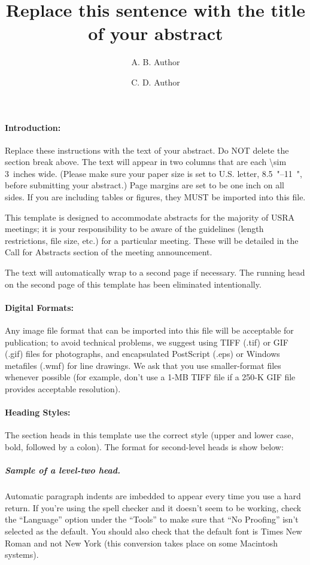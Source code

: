 \documentclass{lpsc_abstract}
\title{Replace this sentence with the title of your abstract}
\author[1]{A. B. Author}
\author[2]{C. D. Author}
\affil[1]{Affiliation (include full mailing address and e-mail address if desired) for first author}
\affil[2]{Affiliation for second author (full mailing address and e-mail address)}
\begin{document}
\maketitle

\paragraph{Introduction:}
Replace these instructions with the text of your abstract.
Do NOT delete the section break above.
The text will appear in two columns that are each \SI{\sim 3}{inches} wide.
(Please make sure your paper size is set to U.S. letter, \SIrange[range-phrase=$\times$]{8.5}{11}{"}, before submitting your abstract.)
Page margins are set to be one inch on all sides.
If you are including tables or figures, they MUST be imported into this file.

This template is designed to accommodate abstracts for the majority of USRA meetings; it is your responsibility to be aware of the guidelines (length restrictions, file size, etc.) for a particular meeting. These will be detailed in the Call for Abstracts section of the meeting announcement.

The text will automatically wrap to a second page if necessary. The running head on the second page of this template has been eliminated intentionally.

\paragraph{Digital Formats:}
Any image file format that can be imported into this file will be acceptable for publication; to avoid technical problems, we suggest using TIFF (.tif) or GIF (.gif) files for photographs, and encapsulated PostScript (.eps) or Windows metafiles (.wmf) for line drawings.
We ask that you use smaller-format files whenever possible (for example, don’t use a 1-MB TIFF file if a 250-K GIF file provides acceptable resolution).

\paragraph{Heading Styles:}
The section heads in this template use the correct style (upper and lower case, bold, followed by a colon). The format for second-level heads is show below:

\subparagraph{Sample of a level-two head.}
Automatic paragraph indents are imbedded to appear every time you use a hard return. If you’re using the spell checker and it doesn’t seem to be working, check the “Language” option under the “Tools” to make sure that “No Proofing” isn’t selected as the default. You should also check that the default font is Times New Roman and not New York (this conversion takes place on some Macintosh systems).
\end{document}
